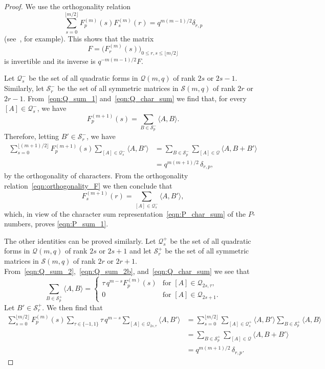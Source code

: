 \documentclass[10pt]{article}
\theoremstyle{definition}
\newcommand{\Q}{\mathscr{Q}}
\renewcommand{\S}{\mathscr{S}}
\renewcommand{\t}{\tau}
\newcommand{\floor}[1]{\lfloor#1\rfloor}
\newcommand{\ang}[1]{\langle#1\rangle}
\begin{document}
\begin{proof}
We use the orthogonality relation
\begin{equation}
\sum_{s=0}^{\floor{m/2}}F^{(m)}_p(s)F^{(m)}_s(r)=q^{m(m-1)/2}\delta_{r,p}   \label{eqn:orthogonality_F}
\end{equation}
(see~\cite[(17)]{DelGoe1975}, for example). This shows that the matrix
\[
F=\Big(F^{(m)}_r(s)\Big)_{0\le r,s\le\floor{m/2}}
\]
is invertible and its inverse is $q^{-m(m-1)/2}F$.
\par
Let $\Q^-_s$ be the set of all quadratic forms in $\Q(m,q)$ of rank $2s$ or $2s-1$. Similarly, let $\S^-_r$ be the set of all symmetric matrices in $\S(m,q)$ of rank $2r$ or $2r-1$. From~\eqref{eqn:Q_sum_1} and~\eqref{eqn:Q_char_sum} we find that, for every $[A]\in\Q^-_s$, we have
\[
F_p^{(m+1)}(s)=\sum_{B\in\S^-_p}\ang{A,B}.
\]
Therefore, letting $B'\in\S^-_r$, we have
\begin{align*}
\sum_{s=0}^{\floor{(m+1)/2}}F^{(m+1)}_p(s)\sum_{[A]\in\Q^-_s}\ang{A,B'}&=
\sum_{B\in\S^-_p}\sum_{[A]\in\Q}\ang{A,B+B'}\\%
&=q^{m(m+1)/2}\,\delta_{r,p},
\end{align*}
by the orthogonality of characters. From the orthogonality relation~\eqref{eqn:orthogonality_F} we then conclude that 
\[
F^{(m+1)}_s(r)=\sum_{[A]\in\Q^-_s}\ang{A,B'},
\]
which, in view of the character sum representation~\eqref{eqn:P_char_sum} of the $P$-numbers, proves \eqref{eqn:P_sum_1}.  
\par
The other identities can be proved similarly. Let $\Q^+_s$ be the set of all quadratic forms in $\Q(m,q)$ of rank $2s$ or $2s+1$ and let $\S^+_r$ be the set of all symmetric matrices in $\S(m,q)$ of rank $2r$ or $2r+1$. From~\eqref{eqn:Q_sum_2},~\eqref{eqn:Q_sum_2b}, and~\eqref{eqn:Q_char_sum} we see that
\[
\sum_{B\in\S^+_p}\ang{A,B}=\begin{cases}
\t\,q^{m-s}F^{(m)}_p(s) & \text{for $[A]\in\Q_{2s,\t}$},\\
0                       & \text{for $[A]\in\Q_{2s+1}$}.
\end{cases}
\]
Let $B'\in\S_r^+$. We then find that
\begin{align*}
\sum_{s=0}^{\floor{m/2}}F^{(m)}_p(s)\sum_{\t\in\{-1,1\}}\t\,q^{m-s}\sum_{[A]\in\Q_{2s,\t}}\ang{A,B'}&=\sum_{s=0}^{\floor{m/2}}\sum_{[A]\in\Q_s^+}\ang{A,B'}\sum_{B\in\S_p^+}\ang{A,B}\\%
&=\sum_{B\in\S_p^+}\sum_{[A]\in\Q}\ang{A,B+B'}\\%
&=q^{m(m+1)/2}\,\delta_{r,p}.
\end{align*}

\end{proof}
\end{document}
